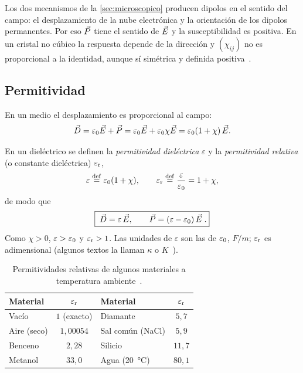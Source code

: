 \begin{observacion}\label{obs:chi-positiva}
Los dos mecanismos de la \cref{sec:microscopico} producen dipolos en el sentido del campo: el desplazamiento de
la nube electrónica y la orientación de los dipolos permanentes. Por eso $\vec P$ tiene el sentido de $\vec E$ y la
susceptibilidad es positiva. En un cristal no cúbico la respuesta depende de la dirección y $(\chi_{ij})$ no es
proporcional a la identidad, aunque sí simétrica y definida positiva~\cite{Landau}.
\end{observacion}

\subsection{Permitividad}\label{sec:permitividad}

En un medio \LHI{} el desplazamiento es proporcional al campo:
\[
  \vec D=\varepsilon_0\vec E+\vec P=\varepsilon_0\vec E+\varepsilon_0\chi\vec E=\varepsilon_0(1+\chi)\,\vec E .
\]

\begin{definicion}[Permitividad]\label{def:permitividad}
En un dieléctrico \LHI{} se definen la \emph{permitividad dieléctrica} $\varepsilon$ y la \emph{permitividad relativa}
(o constante dieléctrica) $\varepsilon_{\mathrm r}$,
\begin{equation}\label{eq:epsilon}
  \varepsilon\mathrel{\overset{\mathrm{def}}{=}}\varepsilon_0(1+\chi),\qquad \varepsilon_{\mathrm r}\mathrel{\overset{\mathrm{def}}{=}}\frac{\varepsilon}{\varepsilon_0}=1+\chi ,
\end{equation}
de modo que
\begin{equation}\label{eq:D-epsilon}
  \boxed{\;\vec D=\varepsilon\,\vec E,\qquad \vec P=(\varepsilon-\varepsilon_0)\,\vec E\; .}
\end{equation}
Como $\chi>0$, $\varepsilon>\varepsilon_0$ y $\varepsilon_{\mathrm r}>1$. Las unidades de $\varepsilon$ son las de $\varepsilon_0$, $\si{F/m}$; $\varepsilon_{\mathrm r}$ es adimensional
(algunos textos la llaman $\kappa$ o $K$~\cite{Purcell}).
\end{definicion}

\begin{table}[t]
\centering
\caption{Permitividades relativas de algunos materiales a temperatura ambiente~\cite{Griffiths}.}
\label{tab:permitividades}
\begin{tabular}{@{}lc@{\qquad}lc@{}}
\toprule
Material & $\varepsilon_{\mathrm r}$ & Material & $\varepsilon_{\mathrm r}$\\
\midrule
Vacío & $1$ (exacto) & Diamante & $5{,}7$\\
Aire (seco) & $1{,}00054$ & Sal común (NaCl) & $5{,}9$\\
Benceno & $2{,}28$ & Silicio & $11{,}7$\\
Metanol & $33{,}0$ & Agua (\SI{20}{\celsius}) & $80{,}1$\\
\bottomrule
\end{tabular}
\end{table}


